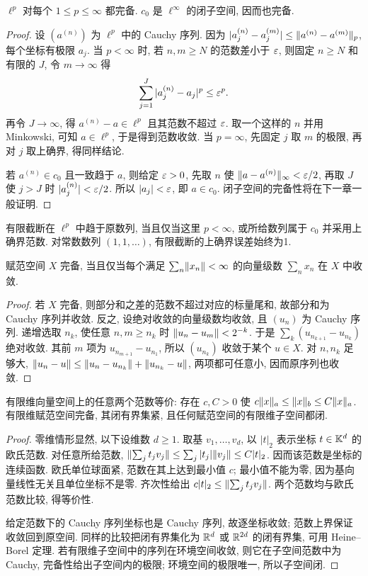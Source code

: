\begin{theorem}\label{thm:lpseqbanach}
$\ell^p$ 对每个 $1\le p\le\infty$ 都完备. $c_0$ 是 $\ell^\infty$ 的闭子空间, 因而也完备.
\end{theorem}
\begin{proof}
设 $(a^{(n)})$ 为 $\ell^p$ 中的 Cauchy 序列. 因为 $|a_j^{(n)}-a_j^{(m)}|\le\lVert a^{(n)}-a^{(m)}\rVert_p$, 每个坐标有极限 $a_j$. 当 $p<\infty$ 时, 若 $n,m\ge N$ 的范数差小于 $\varepsilon$, 则固定 $n\ge N$ 和有限的 $J$, 令 $m\to\infty$ 得
\[
\sum_{j=1}^J|a_j^{(n)}-a_j|^p\le\varepsilon^p.
\]
再令 $J\to\infty$, 得 $a^{(n)}-a\in\ell^p$ 且其范数不超过 $\varepsilon$. 取一个这样的 $n$ 并用 Minkowski, 可知 $a\in\ell^p$, 于是得到范数收敛. 当 $p=\infty$, 先固定 $j$ 取 $m$ 的极限, 再对 $j$ 取上确界, 得同样结论.

若 $a^{(n)}\in c_0$ 且一致趋于 $a$, 则给定 $\varepsilon>0$, 先取 $n$ 使 $\lVert a-a^{(n)}\rVert_\infty<\varepsilon/2$, 再取 $J$ 使 $j>J$ 时 $|a_j^{(n)}|<\varepsilon/2$. 所以 $|a_j|<\varepsilon$, 即 $a\in c_0$. 闭子空间的完备性将在下一章一般证明.
\end{proof}
有限截断在 $\ell^p$ 中趋于原数列, 当且仅当这里 $p<\infty$, 或所给数列属于 $c_0$ 并采用上确界范数. 对常数数列 $(1,1,\ldots)$, 有限截断的上确界误差始终为1.

\begin{theorem}\label{thm:series}
赋范空间 $X$ 完备, 当且仅当每个满足 $\sum_n\lVert x_n\rVert<\infty$ 的向量级数 $\sum_n x_n$ 在 $X$ 中收敛.
\end{theorem}
\begin{proof}
若 $X$ 完备, 则部分和之差的范数不超过对应的标量尾和, 故部分和为 Cauchy 序列并收敛. 反之, 设绝对收敛的向量级数均收敛, 且 $(u_n)$ 为 Cauchy 序列. 递增选取 $n_k$, 使任意 $n,m\ge n_k$ 时 $\lVert u_n-u_m\rVert<2^{-k}$. 于是 $\sum_k(u_{n_{k+1}}-u_{n_k})$ 绝对收敛. 其前 $m$ 项为 $u_{n_{m+1}}-u_{n_1}$, 所以 $(u_{n_k})$ 收敛于某个 $u\in X$. 对 $n,n_k$ 足够大,
$\lVert u_n-u\rVert\le\lVert u_n-u_{n_k}\rVert+\lVert u_{n_k}-u\rVert$, 两项都可任意小, 因而原序列也收敛.
\end{proof}

\begin{theorem}\label{thm:finite}
有限维向量空间上的任意两个范数等价: 存在 $c,C>0$ 使 $c\lVert x\rVert_a\le\lVert x\rVert_b\le C\lVert x\rVert_a$. 有限维赋范空间完备, 其闭有界集紧, 且任何赋范空间的有限维子空间都闭.
\end{theorem}
\begin{proof}
零维情形显然, 以下设维数 $d\ge1$. 取基 $v_1,\ldots,v_d$, 以 $|t|_2$ 表示坐标 $t\in\mathbb K^d$ 的欧氏范数. 对任意所给范数,
$\lVert \sum_jt_jv_j\rVert\le\sum_j|t_j|\lVert v_j\rVert\le C|t|_2$. 因而该范数是坐标的连续函数. 欧氏单位球面紧, 范数在其上达到最小值 $c$; 最小值不能为零, 因为基向量线性无关且单位坐标不是零. 齐次性给出 $c|t|_2\le\lVert \sum_jt_jv_j\rVert$. 两个范数均与欧氏范数比较, 得等价性.

给定范数下的 Cauchy 序列坐标也是 Cauchy 序列, 故逐坐标收敛; 范数上界保证收敛回到原空间. 同样的比较把闭有界集化为 $\mathbb R^{d}$ 或 $\mathbb R^{2d}$ 的闭有界集, 可用 Heine--Borel 定理. 若有限维子空间中的序列在环境空间收敛, 则它在子空间范数中为 Cauchy, 完备性给出子空间内的极限; 环境空间的极限唯一, 所以子空间闭.
\end{proof}

